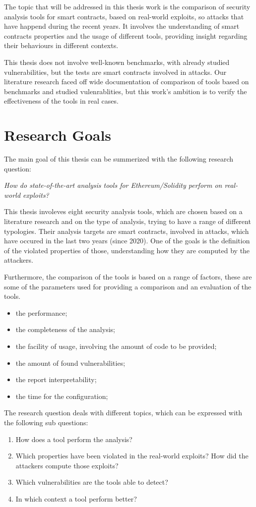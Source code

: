 The topic that will be addressed in this thesis work is the comparison of security analysis tools for smart contracts, based on real-world exploits, so attacks that have happend during the recent years. 
It involves the understanding of smart contracts properties and the usage of different tools, 
providing insight regarding their behaviours in different contexts.

This thesis does not involve well-known benchmarks, with already studied vulnerabilities, 
but the tests are smart contracts involved in attacks. 
Our literature research faced off wide documentation of comparison of tools based on benchmarks and studied vulenrablities, 
but this work's ambition is to verify the effectiveness of the tools in real cases.

\section{Research Goals}
\label{sec:Introduction:ResearchGoals}
The main goal of this thesis can be summerized with the following research question:

\emph{How do state-of-the-art analysis tools for Ethereum/Solidity perform on real-world exploits?}

This thesis involeves eight security analysis tools, which are chosen based on a literature research and on the type of analysis, trying to have a range of different typologies.
Their analysis targets are smart contracts, involved in attacks, which have occured in the last two years (since 2020). 
One of the goals is the definition of the violated properties of those, understanding how they are computed by the attackers.

Furthermore, the comparison of the tools is based on a range of factors, these are some of the parameters used for providing a comparison and an evaluation of the tools.
\begin{itemize}
  \item the performance;
  \item the completeness of the analysis;
  \item the facility of usage, involving the amount of code to be provided;
  \item the amount of found vulnerabilities;
  \item the report interpretability;  
  \item the time for the configuration;
\end{itemize}  

The research question deals with different topics, which can be expressed with the following sub questions: 
\begin{enumerate}
  \item How does a tool perform the analysis? 
  \item Which properties have been violated in the real-world exploits? How did the attackers compute those exploits?
  \item Which vulnerabilities are the tools able to detect? 
  \item In which context a tool perform better?
\end{enumerate}


